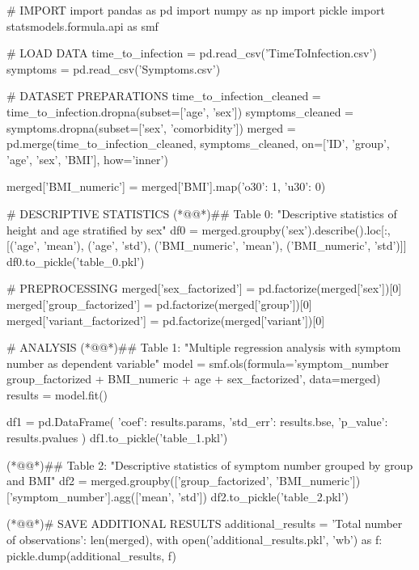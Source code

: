 \documentclass[11pt]{article}
\begin{document}
\begin{python}

# IMPORT
import pandas as pd
import numpy as np
import pickle
import statsmodels.formula.api as smf 

# LOAD DATA
time_to_infection = pd.read_csv('TimeToInfection.csv')
symptoms = pd.read_csv('Symptoms.csv')

# DATASET PREPARATIONS
time_to_infection_cleaned = time_to_infection.dropna(subset=['age', 'sex'])
symptoms_cleaned = symptoms.dropna(subset=['sex', 'comorbidity'])
merged = pd.merge(time_to_infection_cleaned, symptoms_cleaned, on=['ID', 'group', 'age', 'sex', 'BMI'], how='inner')

merged['BMI_numeric'] = merged['BMI'].map({'o30': 1, 'u30': 0})

# DESCRIPTIVE STATISTICS
(*@@*)## Table 0: "Descriptive statistics of height and age stratified by sex"
df0 = merged.groupby('sex').describe().loc[:, [('age', 'mean'), ('age', 'std'), ('BMI_numeric', 'mean'), ('BMI_numeric', 'std')]]
df0.to_pickle('table_0.pkl')

# PREPROCESSING 
merged['sex_factorized'] = pd.factorize(merged['sex'])[0]
merged['group_factorized'] = pd.factorize(merged['group'])[0]
merged['variant_factorized'] = pd.factorize(merged['variant'])[0]

# ANALYSIS
(*@@*)## Table 1: "Multiple regression analysis with symptom number as dependent variable"
model = smf.ols(formula='symptom_number ~ group_factorized + BMI_numeric + age + sex_factorized', data=merged)
results = model.fit()

df1 = pd.DataFrame({
    'coef': results.params,
    'std_err': results.bse,
    'p_value': results.pvalues
})
df1.to_pickle('table_1.pkl')

(*@@*)## Table 2: "Descriptive statistics of symptom number grouped by group and BMI"
df2 = merged.groupby(['group_factorized', 'BMI_numeric'])['symptom_number'].agg(['mean', 'std'])
df2.to_pickle('table_2.pkl')

(*@@*)# SAVE ADDITIONAL RESULTS
additional_results = {
    'Total number of observations': len(merged),
}
with open('additional_results.pkl', 'wb') as f:
    pickle.dump(additional_results, f)

\end{python}
\end{document}
